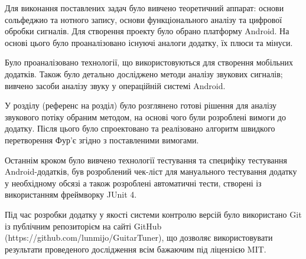 
Для виконання поставлених задач було вивчено теоретичний аппарат: основи сольфеджио та нотного запису, основи функціонального аналізу та цифрової обробки сигналів. Для створення проекту було обрано платформу Android. На основі цього було проаналізовано існуючі аналоги додатку, їх плюси та мінуси. 

Було проаналізовано технології, що використовуються для створення мобільних додатків. Також було детально досліджено методи аналізу звукових сигналів; вивчено засоби аналізу звуку у операційній системі Android. 

У розділу (референс на розділ) було розглянено готові рішення для аналізу звукового потіку обраним методом, на основі чого були розроблені вимоги до додатку. Після цього було спроектовано та реалізовано алгоритм швидкого перетворення Фур'є згідно з поставленими вимогами. 

Останнім кроком було вивчено технології тестування та специфіку тестування Android-додатків, був розроблений чек-ліст для мануального тестування додатку у необхідному обсязі а також розроблені автоматичні тести, створені із використанням фреймворку JUnit 4.

Під час розробки додатку у якості системи контролю версій було використано Git із публічним репозиторієм на сайті GitHub (https://github.com/lunmijo/GuitarTuner), що дозволяє використовувати результати проведеного дослідження всім бажаючим під ліцензією MIT.